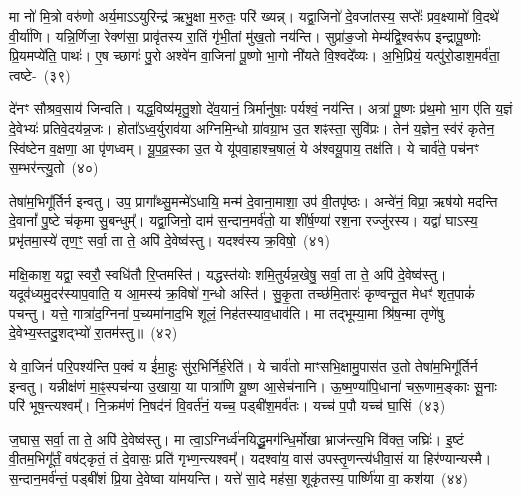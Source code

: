 {\anuvakamend[{विपृ॑क्तो दि॒वा वी॒र्य॑मुपैका॒न्नच॑त्वारि॒ꣳ॒शच्च॑}]}

मा नो॑ मि॒त्रो वरु॑णो अर्य॒मा\-ऽऽ\-युरिन्द्र॑ ऋभु॒क्षा म॒रुतः॒ परि॑ ख्यन्न्। यद्वा॒जिनो॑ दे॒वजा॑तस्य॒ सप्तेः᳚ प्रव॒क्ष्यामो॑ वि॒दथे॑ वी॒र्या॑णि। यन्नि॒र्णिजा॒ रेक्ण॑सा॒ प्रावृ॑तस्य रा॒तिं गृ॑भी॒तां मु॑ख॒तो नय॑न्ति। सुप्रा॑ङ॒जो मेम्य॑द्वि॒श्वरू॑प इन्द्रापू॒ष्णोः प्रि॒यमप्ये॑ति॒ पाथः॑। ए॒ष च्छागः॑ पु॒रो अश्वे॑न वा॒जिना॑ पू॒ष्णो भा॒गो नी॑यते वि॒श्वदे᳚व्यः। अ॒भि॒प्रियं॒ यत्पु॑रो॒डाश॒मर्व॑ता॒ त्वष्टे-~(३९)\ip

दे॑नꣳ सौश्रव॒साय॑ जिन्वति। यद्ध॒विष्य॑मृतु॒शो दे॑व॒यानं॒ त्रिर्मानु॑षाः॒ पर्यश्वं॒ नय॑न्ति। अत्रा॑ पू॒ष्णः प्र॑थ॒मो भा॒ग ए॑ति य॒ज्ञं दे॒वेभ्यः॑ प्रतिवे॒दय॑न्न॒जः। होता᳚\-ऽ\-ध्व॒र्युराव॑या अग्निमि॒न्धो ग्रा॑वग्रा॒भ उ॒त शꣴस्ता॒ सुवि॑प्रः। तेन॑ य॒ज्ञेन॒ स्व॑रं कृतेन॒ स्वि॑ष्टेन व॒क्षणा॒ आ पृ॑णध्वम्। यू॒प॒व्र॒स्का उ॒त ये यू॑पवा॒हाश्च॒षालं॒ ये अ॑श्वयू॒पाय॒ तक्ष॑ति। ये चार्व॑ते॒ पच॑नꣳ स॒म्भर॑न्त्यु॒तो~(४०)\ip

तेषा॑म॒भिगू᳚र्तिर्न इन्वतु। उप॒ प्रागा᳚थ्सु॒मन्मे॑\-ऽधायि॒ मन्म॑ दे॒वाना॒माशा॒ उप॑ वी॒तपृ॑ष्ठः। अन्वे॑नं॒ विप्रा॒ ऋष॑यो मदन्ति दे॒वानां᳚ पु॒ष्टे च॑कृमा सु॒बन्धुम्᳚। यद्वा॒जिनो॒ दाम॑ स॒न्दान॒मर्व॑तो॒ या शी॑र्\mbox{}ष॒ण्या॑ रश॒ना रज्जु॑रस्य। यद्वा॑ घाऽस्य॒ प्रभृ॑तमा॒स्ये॑ तृण॒ꣳ॒ सर्वा॒ ता ते॒ अपि॑ दे॒वेष्व॑स्तु। यदश्व॑स्य क्र॒विषो॒~(४१)\ip

मक्षि॒काश॒ यद्वा॒ स्वरौ॒ स्वधि॑तौ रि॒प्तमस्ति॑। यद्धस्त॑योः शमि॒तुर्यन्न॒खेषु॒ सर्वा॒ ता ते॒ अपि॑ दे॒वेष्व॑स्तु। यदूव॑ध्यमु॒दर॑स्याप॒वाति॒ य आ॒मस्य॑ क्र॒विषो॑ ग॒न्धो अस्ति॑। सु॒कृ॒ता तच्छ॑मि॒तारः॑ कृण्वन्तू॒त मेधꣳ॑ शृत॒पाकं॑ पचन्तु। यत्ते॒ गात्रा॑द॒ग्निना॑ प॒च्यमा॑नाद॒भि शूलं॒ निह॑तस्याव॒धाव॑ति। मा तद्भूम्या॒मा श्रि॑ष॒न्मा तृणे॑षु दे॒वेभ्य॒स्तदु॒शद्भ्यो॑ रा॒तम॑स्तु॥~(४२)\ip

{\anuvakamend[{इदु॒तो क्र॒विषः॑ श्रिषथ्स॒प्त च॑}]}

ये वा॒जिनं॑ परि॒पश्य॑न्ति प॒क्वं य ई॑मा॒हुः सु॑र॒भिर्निर्\mbox{}ह॒रेति॑। ये चार्व॑तो माꣳसभि॒क्षामु॒पास॑त उ॒तो तेषा॑म॒भिगू᳚र्तिर्न इन्वतु। यन्नीक्ष॑णं मा॒ꣴ॒स्पच॑न्या उ॒खाया॒ या पात्रा॑णि यू॒ष्ण आ॒सेच॑नानि। ऊ॒ष्म॒ण्या॑पि॒धाना॑ चरू॒णाम॒ङ्काः सू॒नाः परि॑ भूष॒न्त्यश्वम्᳚। नि॒क्रम॑णं नि॒षद॑नं वि॒वर्त॑नं॒ यच्च॒ पड्बी॑श॒मर्व॑तः। यच्च॑ प॒पौ यच्च॑ घा॒सिं~(४३)\ip

ज॒घास॒ सर्वा॒ ता ते॒ अपि॑ दे॒वेष्व॑स्तु। मा त्वा॒\-ऽ\-ग्निर्ध्व॑नयिद्धू॒मग॑न्धि॒र्मोखा भ्राज॑न्त्य॒भि वि॑क्त॒ जघ्रिः॑। इ॒ष्टं वी॒तम॒भिगू᳚र्तं॒ वष॑ट्कृतं॒ तं दे॒वासः॒ प्रति॑ गृभ्ण॒न्त्यश्वम्᳚। यदश्वा॑य॒ वास॑ उपस्तृ॒णन्त्य॑धीवा॒सं या हिर॑ण्यान्यस्मै। स॒न्दान॒मर्व॑न्तं॒ पड्बी॑शं प्रि॒या दे॒वेष्वा या॑मयन्ति। यत्ते॑ सा॒दे मह॑सा॒ शूकृ॑तस्य॒ पार्ष्णि॑या वा॒ कश॑या~(४४)\ip

